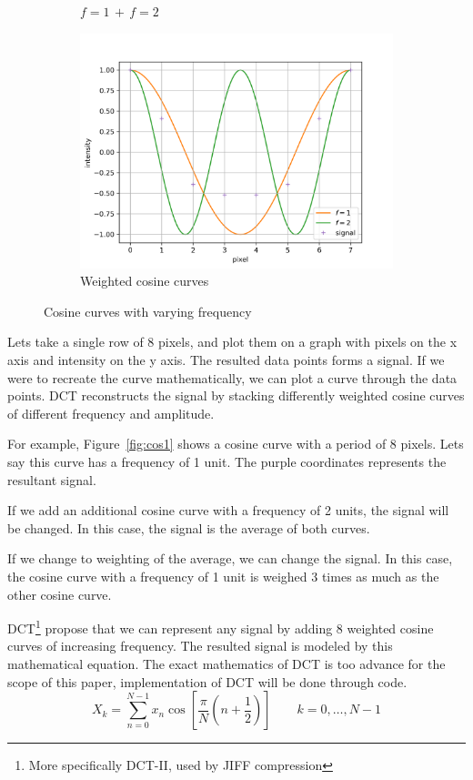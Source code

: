 \documentclass{article}
\begin{document}
\begin{figure}[h]
\begin{subfigure}[b]{0.30\textwidth}
	\caption{$f=1\, + \, f = 2$}
	\label{fig:cos2}
\end{subfigure}
\begin{subfigure}[b]{0.30\textwidth}
	\centering
	\includegraphics[width=\textwidth]{./figures/dct/cos3}
	\caption{Weighted cosine curves}
	\label{fig:cos3}
\end{subfigure}
\caption{Cosine curves with varying frequency}
\end{figure}

Lets take a single row of 8 pixels, and plot them on a graph with pixels on the x axis and intensity on the y axis.
The resulted data points forms a signal.
If we were to recreate the curve mathematically, we can plot a curve through the data points.
DCT reconstructs the signal by stacking differently weighted cosine curves of different frequency and amplitude.

For example, Figure~\ref{fig:cos1} shows a cosine curve with a period of 8 pixels.
Lets say this curve has a frequency of 1 unit.
The purple coordinates represents the resultant signal.

If we add an additional cosine curve with a frequency of 2 units, the signal will be changed.
In this case, the signal is the average of both curves.

If we change to weighting of the average, we can change the signal.
In this case, the cosine curve with a frequency of 1 unit is weighed 3 times as much as the other cosine curve.

DCT\footnote{More specifically DCT-II, used by JIFF compression} propose that we can represent any signal by adding 8 weighted cosine curves of increasing frequency.
The resulted signal is modeled by this mathematical equation.
The exact mathematics of DCT is too advance for the scope of this paper, implementation of DCT will be done through code.
\begin{equation}
	X_k = \sum_{n=0}^{N-1} x_n \cos \left [ \frac{\pi}{N} \left ( n + \frac{1}{2} \right ) \right ] \qquad k = 0, \dots , N - 1
\end{equation}
\end{document}
